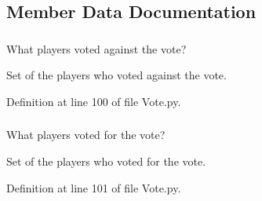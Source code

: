 \subsection{Member Data Documentation}
\hypertarget{class_vote_1_1_vote_ad28b3d5cd63141ad2e23a900927724e6}{
\subsubsection[{\_\-\_\-players\_\-voted\_\-no}]{}}
\label{class_vote_1_1_vote_ad28b3d5cd63141ad2e23a900927724e6}


What players voted against the vote? 

Set of the players who voted against the vote. 

Definition at line 100 of file Vote.py.

\hypertarget{class_vote_1_1_vote_a6a3289f868e2d8898c27e6905fe68e19}{
\subsubsection[{\_\-\_\-players\_\-voted\_\-yes}]{}}
\label{class_vote_1_1_vote_a6a3289f868e2d8898c27e6905fe68e19}


What players voted for the vote? 

Set of the players who voted for the vote. 

Definition at line 101 of file Vote.py.

\hypertarget{class_vote_1_1_vote_a7540d71a94e58d4a4877a8a949232fe3}{
\subsubsection[{action}]{}}
\label{class_vote_1_1_vote_a7540d71a94e58d4a4877a8a949232fe3}


